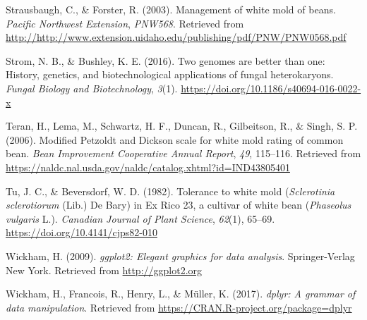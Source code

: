 \hypertarget{ref-strausbaugh2003management}{}
Strausbaugh, C., \& Forster, R. (2003). Management of white mold of
beans. \emph{Pacific Northwest Extension}, \emph{PNW568}. Retrieved from
\url{http://http://www.extension.uidaho.edu/publishing/pdf/PNW/PNW0568.pdf}

\hypertarget{ref-strom2016genomes}{}
Strom, N. B., \& Bushley, K. E. (2016). Two genomes are better than one:
History, genetics, and biotechnological applications of fungal
heterokaryons. \emph{Fungal Biology and Biotechnology}, \emph{3}(1).
\url{https://doi.org/10.1186/s40694-016-0022-x}

\hypertarget{ref-teran2006modified}{}
Teran, H., Lema, M., Schwartz, H. F., Duncan, R., Gilbeitson, R., \&
Singh, S. P. (2006). Modified Petzoldt and Dickson scale for white mold
rating of common bean. \emph{Bean Improvement Cooperative Annual
Report}, \emph{49}, 115--116. Retrieved from
\url{https://naldc.nal.usda.gov/naldc/catalog.xhtml?id=IND43805401}

\hypertarget{ref-tu1982tolerance}{}
Tu, J. C., \& Beversdorf, W. D. (1982). Tolerance to white mold
(\emph{Sclerotinia sclerotiorum} (Lib.) De Bary) in Ex Rico 23, a
cultivar of white bean (\emph{Phaseolus vulgaris} L.). \emph{Canadian
Journal of Plant Science}, \emph{62}(1), 65--69.
\url{https://doi.org/10.4141/cjps82-010}

\hypertarget{ref-ggplot2}{}
Wickham, H. (2009). \emph{ggplot2: Elegant graphics for data analysis}.
Springer-Verlag New York. Retrieved from \url{http://ggplot2.org}

\hypertarget{ref-dplyr}{}
Wickham, H., Francois, R., Henry, L., \& Müller, K. (2017). \emph{dplyr:
A grammar of data manipulation}. Retrieved from
\url{https://CRAN.R-project.org/package=dplyr}



